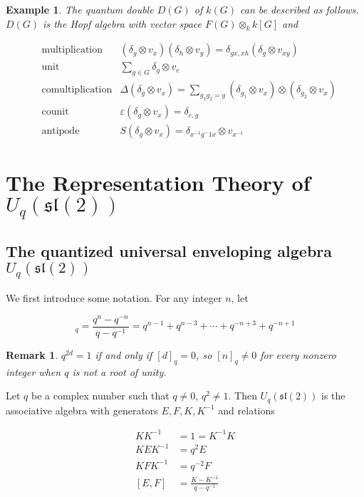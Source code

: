 \documentclass[]{article}
\newtheorem{remark}[theorem]{Remark}
\newtheorem{example}[theorem]{Example}
\numberwithin{equation}{subsection}
\begin{document}
\begin{example}
    The quantum double $D(G)$ of $k(G)$ can be described as follows. $D(G)$ is the Hopf algebra with vector space $F(G) \otimes_k k[G]$ and 

    \begin{align}
        &\text{multiplication} &(\delta_g\otimes v_x) (\delta_h \otimes v_y) = \delta_{gx,xh} (\delta_g \otimes v_{xy})\\
        &\text{unit}           &\sum_{g \in G} \delta_g  \otimes v_e\\
        &\text{comultiplication} &\Delta(\delta_g \otimes v_x) = \sum_{g_1 g_2 = g} (\delta_{g_1} \otimes v_x) \otimes (\delta_{g_2} \otimes v_x) \\
        &\text{counit}           &\varepsilon(\delta_g \otimes v_x) = \delta_{e,g} \\
        &\text{antipode}         &S(\delta_g \otimes v_x) = \delta_{x^{-1}g^-1 x} \otimes v_{x^{-1}}
    \end{align}


\end{example}


\section{The Representation Theory of $U_q(\mathfrak{sl}(2))$}
\subsection{The quantized universal enveloping algebra $U_q(\mathfrak{sl}(2))$}
We first introduce some notation. For any integer $n$, let 

\begin{equation}
    [n]_q = \frac{q^n - q^{-n}}{q - q^{-1}} = q^{n-1} + q^{n-3} + \cdots + q^{-n+3} + q^{-n+1}
\end{equation}

\begin{remark}
$q^{2d}=1$ if and only if $[d]_q = 0$, so $[n]_q \neq 0$ for every nonzero integer when $q$ is not a root of unity. 
\end{remark}

Let $q$ be a complex number such that $q \neq 0$, $q^2 \neq 1$.  Then $U_q(\mathfrak{sl}(2))$ is the associative algebra with generators $E,F,K, K^{-1}$ and relations 

\begin{align}
    KK^{-1} &= 1 = K^{-1}K \\
    KEK^{-1} &= q^2 E \\
    KFK^{-1} &= q^{-2} F \\
    [E,F] &= \frac{K - K^{-1}}{q - q^{-1}}
\end{align}
\end{document}
